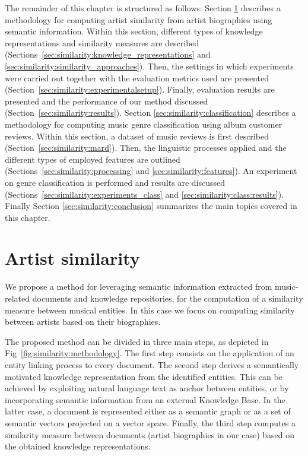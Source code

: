 The remainder of this chapter is structured as follows: Section \ref{sec:similarity:similarity} describes a methodology for computing artist similarity from artist biographies using semantic information. Within this section, different types of knowledge representations and similarity measures are described (Sections~\ref{sec:similarity:knowledge_representations} and \ref{sec:similarity:similarity_approaches}). Then, the settings in which experiments were carried out together with the evaluation metrics used are presented (Section~\ref{sec:similarity:experimentalsetup}). Finally, evaluation results are presented and the performance of our method discussed (Section~\ref{sec:similarity:results}). Section \ref{sec:similarity:classification} describes a methodology for computing music genre classification using album customer reviews. Within this section, a dataset of music reviews is first described (Section~\ref{sec:similarity:mard}). Then, the linguistic processes applied and the different types of employed features are outlined (Sections~\ref{sec:similarity:processing} and \ref{sec:similarity:features}). An experiment on genre classification is performed and results are discussed (Sections~\ref{sec:similarity:experiments_class} and \ref{sec:similarity:class:results}). 
Finally Section \ref{sec:similarity:conclusion} summarizes the main topics covered in this chapter.

\section{Artist similarity}
\label{sec:similarity:similarity}

We propose a method for leveraging semantic information extracted from music-related documents and knowledge repositories, for the computation of a similarity measure between musical entities. In this case we focus on computing similarity between artists based on their biographies. 

The proposed method can be divided in three main steps, as depicted in Fig~\ref{fig:similarity:methodology}.
The first step consists on the application of an entity linking process to every document. 
The second step derives a semantically motivated knowledge representation from the identified entities. This can be achieved by exploiting natural language text as anchor between entities, or by incorporating semantic information from an external Knowledge Base. In the latter case, a document is represented either as a semantic graph or as a set of semantic vectors projected on a vector space.
Finally, the third step computes a similarity measure between documents (artist biographies in our case) based on the obtained knowledge representations. %

